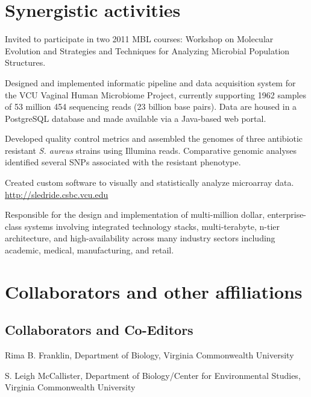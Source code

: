 \section{Synergistic activities}
\begin{packed_item}
	\item{Invited to participate in two 2011 MBL courses: Workshop on Molecular Evolution and Strategies 
	and Techniques for Analyzing Microbial Population Structures}.
	\item{Designed and implemented informatic pipeline and data acquisition system for the VCU Vaginal Human Microbiome 
	Project, currently supporting \num{1962} samples of 53 million 454 sequencing reads (23 billion base pairs).  Data 
	are housed in a PostgreSQL database and made available via a Java-based web portal.}
	\item{Developed quality control metrics and assembled the genomes of three antibiotic resistant \textit{S. aureus} 
	strains using Illumina reads.  Comparative genomic analyses identified several SNPs associated with the resistant phenotype.}
	\item{Created custom software to visually and statistically analyze microarray data.\\
	 \url{http://sledride.csbc.vcu.edu}}
	\item{Responsible for the design and implementation of multi-million dollar, enterprise-class systems involving 
	integrated technology stacks, multi-terabyte, n-tier architecture, and high-availability across many industry 
	sectors including academic, medical, manufacturing, and retail.}
\end{packed_item}

\section{Collaborators and other affiliations}

\subsection*{Collaborators and Co-Editors}
\begin{packed_item}
	\item{Rima B. Franklin, Department of Biology, Virginia Commonwealth University}
	\item{S. Leigh McCallister, Department of Biology/Center for Environmental Studies, 
	Virginia Commonwealth University}		
\end{packed_item}

